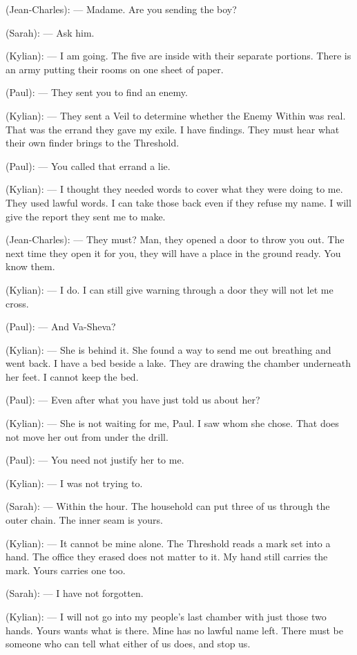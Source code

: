\begin{room}
(Jean-Charles): --- Madame. Are you sending the boy?

(Sarah): --- Ask him.

(Kylian): --- I am going. The five are inside with their separate portions. There is an army putting their rooms on one sheet of paper.

(Paul): --- They sent you to find an enemy.

(Kylian): --- They sent a Veil to determine whether the Enemy Within was real. That was the errand they gave my exile. I have findings. They must hear what their own finder brings to the Threshold.

(Paul): --- You called that errand a lie.

(Kylian): --- I thought they needed words to cover what they were doing to me. They used lawful words. I can take those back even if they refuse my name. I will give the report they sent me to make.

(Jean-Charles): --- They must? Man, they opened a door to throw you out. The next time they open it for you, they will have a place in the ground ready. You know them.

(Kylian): --- I do. I can still give warning through a door they will not let me cross.

(Paul): --- And Va-Sheva?

\centerline{}

(Kylian): --- She is behind it. She found a way to send me out breathing and went back. I have a bed beside a lake. They are drawing the chamber underneath her feet. I cannot keep the bed.

(Paul): --- Even after what you have just told us about her?

(Kylian): --- She is not waiting for me, Paul. I saw whom she chose. That does not move her out from under the drill.

(Paul): --- You need not justify her to me.

(Kylian): --- I was not trying to.

(Sarah): --- Within the hour. The household can put three of us through the outer chain. The inner seam is yours.

(Kylian): --- It cannot be mine alone. The Threshold reads a mark set into a hand. The office they erased does not matter to it. My hand still carries the mark. Yours carries one too.

(Sarah): --- I have not forgotten.

(Kylian): --- I will not go into my people's last chamber with just those two hands. Yours wants what is there. Mine has no lawful name left. There must be someone who can tell what either of us does, and stop us.


\end{room}
